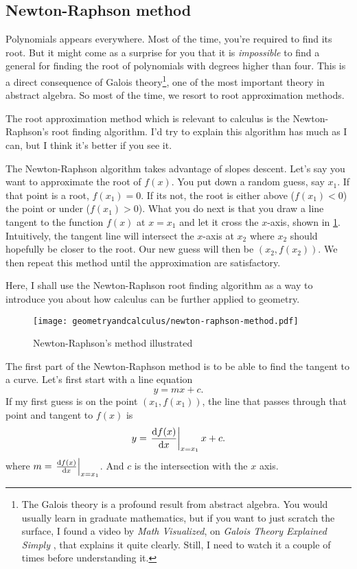 \subsection{Newton-Raphson method}

Polynomials appears everywhere. Most of the time, you're required to find its root. But it might come as a surprise for you that it is \emph{impossible} to find a general for finding the root of polynomials with degrees higher than four. This is a direct consequence of Galois theory\footnote{The Galois theory is a profound result from abstract algebra. You would usually learn in graduate mathematics, but if you want to just scratch the surface, I found a video by \emph{Math Visualized}, on \emph{Galois Theory Explained Simply} \cite{galois-explained-2020}, that explains it quite clearly. Still, I need to watch it a couple of times before understanding it.}, one of the most important theory in abstract algebra. So most of the time, we resort to root approximation methods.

The root approximation method which is relevant to calculus is the Newton-Raphson's root finding algorithm. I'd try to explain this algorithm has much as I can, but I think it's better if you see it.

The Newton-Raphson algorithm takes advantage of slopes descent. Let's say you want to approximate the root of $f(x)$. You put down a random guess, say $x_1$. If that point is a root, $f(x_1) = 0$. If its not, the root is either above ($f(x_1) < 0$) the point or under ($f(x_1) > 0$). What you do next is that you draw a line tangent to the function $f(x)$ at $x = x_1$ and let it cross the $x$-axis, shown in \cref{fig:newton-raphson-method}. Intuitively, the tangent line will intersect the $x$-axis at $x_2$ where $x_2$ should hopefully be closer to the root. Our new guess will then be $(x_2, f(x_2))$. We then repeat this method until the approximation are satisfactory.

Here, I shall use the Newton-Raphson root finding algorithm as a way to introduce you about how calculus can be further applied to geometry.

\begin{figure}[ht]
	\centering
	\texttt{[image: geometryandcalculus/newton-raphson-method.pdf]}
	\caption{Newton-Raphson's method illustrated}
	\label{fig:newton-raphson-method}
\end{figure}

The first part of the Newton-Raphson method is to be able to find the tangent to a curve. Let's first start with a line equation
\begin{equation}
	y = mx + c.
\end{equation}
If my first guess is on the point $(x_1, f(x_1))$, the line that passes through that point and tangent to $f(x)$ is
\begin{equation}
	y = \odv{f(x)}{x}_{x = x_1}x + c.
\end{equation}
where $m = \odv{f(x)}{x}_{x = x_1}$. And $c$ is the intersection with the $x$ axis.

